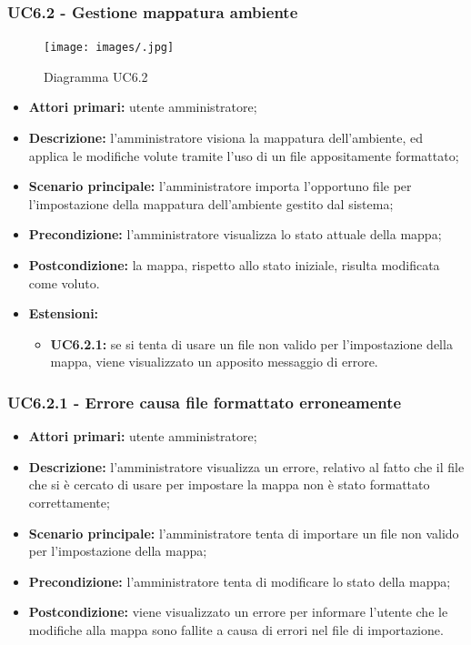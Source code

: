 \subsubsection{UC6.2 - Gestione mappatura ambiente}
	\begin{center}
		\begin{figure}[h!]
			\texttt{[image: images/.jpg]}
			\caption{Diagramma UC6.2}
		\end{figure}
	\end{center}
	\begin{itemize}
		\item \textbf{Attori primari:} utente amministratore;
		\item \textbf{Descrizione:} l'amministratore visiona la mappatura dell'ambiente, ed applica le modifiche volute tramite l'uso di un file appositamente formattato;
		\item \textbf{Scenario principale:} l'amministratore importa l'opportuno file per l'impostazione della mappatura dell'ambiente gestito dal sistema;
		\item \textbf{Precondizione:} l'amministratore visualizza lo stato attuale della mappa;
		\item \textbf{Postcondizione:} la mappa, rispetto allo stato iniziale, risulta modificata come voluto.
		\item \textbf{Estensioni:}
		\begin{itemize}
			\item \textbf{UC6.2.1:} se si tenta di usare un file non valido per l'impostazione della mappa, viene visualizzato un apposito messaggio di errore.
		\end{itemize}
	\end{itemize}

\subsubsection{UC6.2.1 - Errore causa file formattato erroneamente}
\begin{itemize}
	\item \textbf{Attori primari:} utente amministratore;
	\item \textbf{Descrizione:} l'amministratore visualizza un errore, relativo al fatto che il file che si è cercato di usare per impostare la mappa non è stato formattato correttamente;
	\item \textbf{Scenario principale:} l'amministratore tenta di importare un file non valido per l'impostazione della mappa;
	\item \textbf{Precondizione:} l'amministratore tenta di modificare lo stato della mappa;
	\item \textbf{Postcondizione:} viene visualizzato un errore per informare l'utente che le modifiche alla mappa sono fallite a causa di errori nel file di importazione.
\end{itemize}

